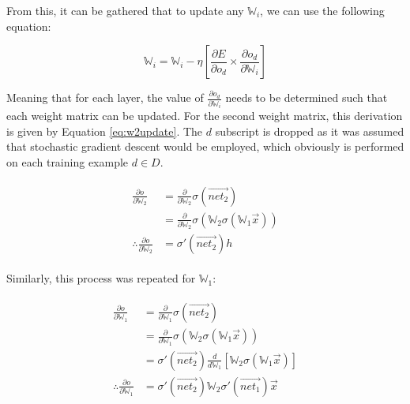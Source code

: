 \documentclass[a4paper]{article}
\begin{document}
From this, it can be gathered that to update any $\mathbb W_i$, we can use the following equation:

\begin{equation}
    \label{eq:keyweightupdating}
    \mathbb W_i = \mathbb W_i - \eta \left[ \frac{\partial{E}}{\partial{o_d}}\times\frac{\partial{o_d}}{\partial{\mathbb W_i}} \right]
\end{equation}

Meaning that for each layer, the value of $\frac{\partial{o_d}}{\partial{\mathbb W_i}}$ needs to be determined such that each weight matrix can be updated. For the second weight matrix, this derivation is given by Equation \ref{eq:w2update}. The $d$ subscript is dropped as it was assumed that stochastic gradient descent would be employed, which obviously is performed on each training example $d \in D$.

\begin{gather}
    \begin{aligned}
        \label{eq:w2update}
        \frac{\partial{o}}{\partial{\mathbb W_2}} &= \frac{\partial}{\partial{\mathbb W_2}}\sigma(\overrightarrow{net_2}) \\
        &= \frac{\partial}{\partial{\mathbb W_2}}\sigma(\mathbb W_2 \sigma(\mathbb W_1 \overrightarrow{x})) \\
        \therefore \frac{\partial{o}}{\partial{\mathbb W_2}} &= \sigma'(\overrightarrow{net_2})h
    \end{aligned}
\end{gather}

Similarly, this process was repeated for $\mathbb W_1$:

\begin{gather}
    \begin{aligned}
        \label{eq:w1update}
        \frac{\partial{o}}{\partial{\mathbb W_1}} &= \frac{\partial}{\partial{\mathbb W_1}}\sigma(\overrightarrow{net_2}) \\
        &= \frac{\partial}{\partial{\mathbb W_1}}\sigma(\mathbb W_2 \sigma(\mathbb W_1 \overrightarrow{x})) \\
        &= \sigma'(\overrightarrow{net_2})\frac{d}{d{\mathbb W_1}}\left[ \mathbb W_2 \sigma(\mathbb W_1 \overrightarrow{x}) \right]\\
        \therefore \frac{\partial{o}}{\partial{\mathbb W_1}} &= \sigma'(\overrightarrow{net_2})\mathbb W_2 \sigma'(\overrightarrow{net_1})\overrightarrow{x}
    \end{aligned}
\end{gather}
\end{document}
